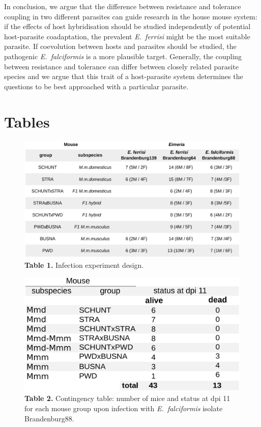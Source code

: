 \documentclass[12pt]{article}
\begin{document}
In conclusion, we argue that the difference between resistance and tolerance coupling in two different parasites can guide research in the house mouse system: if the effects of host hybridisation should be studied independently of potential host-parasite coadaptation, the prevalent \textit{E.~ferrisi} might be the most suitable parasite. If coevolution between hosts and parasites should be studied, the pathogenic \textit{E.~falciformis} is a more plausible target. Generally, the coupling between resistance and tolerance can differ between closely related parasite species and we argue that this trait of a host-parasite system determines the questions to be best approached with a particular parasite. 

\printbibliography

\section*{Tables}

\begin{figure}[H]
	\centering
	\includegraphics[width=\linewidth,height=\textheight,keepaspectratio]{images/Table1_final.pdf}
	\captionsetup{labelformat=empty}
	\caption{\textbf{Table 1.} Infection experiment design.}
\end{figure}
\addtocounter{figure}{-1}

\begin{figure}[H]
	\centering
	\includegraphics[width=\linewidth,height=\textheight,keepaspectratio]{images/Table2_final.pdf}
	\captionsetup{labelformat=empty}
	\caption{\textbf{Table 2.} Contingency table: number of mice and status at dpi 11 for each mouse group upon infection with \textit{E. falciformis} isolate Brandenburg88.}
\end{figure}
\addtocounter{figure}{-1}
\end{document}
